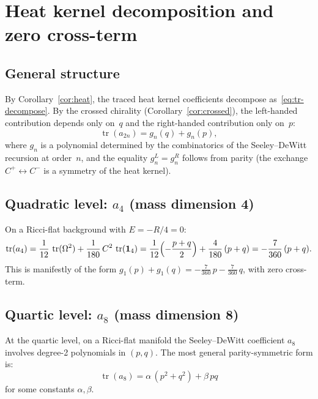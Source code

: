 \documentclass[12pt,a4paper]{article}
\theoremstyle{definition}
\theoremstyle{remark}
\newcommand{\tr}{\operatorname{tr}}
\begin{document}
\section{Heat kernel decomposition and zero cross-term}
\label{sec:heat}

\subsection{General structure}

By Corollary~\ref{cor:heat}, the traced heat kernel coefficients decompose
as~\eqref{eq:tr-decompose}.  By the crossed chirality
(Corollary~\ref{cor:crossed}), the left-handed contribution depends only
on~$q$ and the right-handed contribution only on~$p$:
\begin{equation}\label{eq:fn-decompose}
  \tr(a_{2n}) = g_n(q) + g_n(p),
\end{equation}
where $g_n$ is a polynomial determined by the combinatorics of the
Seeley--DeWitt recursion at order~$n$, and the equality $g_n^L = g_n^R$
follows from parity (the exchange $C^+ \leftrightarrow C^-$ is a symmetry
of the heat kernel).

\subsection{Quadratic level: \texorpdfstring{$a_4$}{a4} (mass dimension 4)}
\label{sec:a4}

On a Ricci-flat background with $E = -R/4 = 0$:
\begin{equation}\label{eq:a2}
  \tr(a_4) = \frac{1}{12}\,\tr(\Omega^2) + \frac{1}{180}\,C^2\,\tr(\mathbf{1}_4)
  = \frac{1}{12}\Bigl(-\frac{p+q}{2}\Bigr) + \frac{4}{180}\,(p+q)
  = -\frac{7}{360}\,(p + q).
\end{equation}
This is manifestly of the form $g_1(p) + g_1(q) = -\frac{7}{360}\,p
- \frac{7}{360}\,q$, with zero cross-term.

\subsection{Quartic level: \texorpdfstring{$a_8$}{a8} (mass dimension 8)}
\label{sec:a8}

At the quartic level, on a Ricci-flat manifold the Seeley--DeWitt coefficient
$a_8$ involves degree-2 polynomials in $(p, q)$.  The most general
parity-symmetric form is:
\begin{equation}\label{eq:a8-general}
  \tr(a_8) = \alpha\,(p^2 + q^2) + \beta\,pq
\end{equation}
for some constants $\alpha, \beta$.
\end{document}
